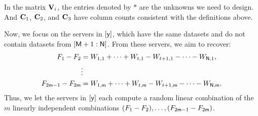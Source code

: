 \documentclass[conference,letterpaper]{IEEEtran}
\begin{document}
In the matrix ${\bf V}_i$, the entries denoted by $*$ are the unknowns we need to design. And ${\bf C}_1$, ${\bf C}_2$, and ${\bf C}_3$ have column counts consistent with the definitions above.

Now, we focus on the servers in $[{\sf y}]$, which have the same datasets and do not contain datasets from $[{\sf M}+1 : {\sf N}]$. From these servers, we aim to recover:
\begin{align*}
    F_1 - F_2 &= W_{1,1} + \cdots + W_{t,1} - W_{t+1,1} - \cdots - W_{{\sf N},1}, \\
    &\vdots \\
    F_{2{\sf m} - 1} - F_{2{\sf m}} &= W_{1,{\sf m}} + \cdots + W_{t,{\sf m}} - W_{t+1,{\sf m}} - \cdots - W_{{\sf N},{\sf m}}.
\end{align*}
Thus, we let the servers in $[{\sf y}]$ each compute a random linear combination of the $m$ linearly independent combinations $(F_1 - F_2), \ldots, (F_{2{\sf m} - 1} - F_{2{\sf m}})$.
\end{document}
